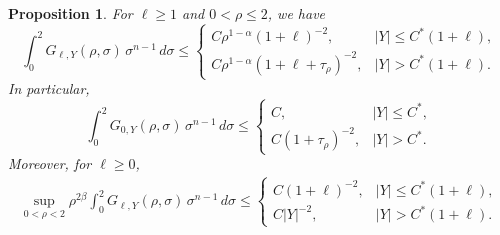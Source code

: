 \documentclass[12pt]{amsart}
\newtheorem{proposition}[theorem]{Proposition}
\begin{document}
\begin{proposition}\label{prop:Green:Shur}
For $\ell\ge 1$ and $0<\rho\le 2$, we have
\begin{equation}\label{eq_basic_R_schur_improved}
    \int_0^2 G_{\ell,Y}(\rho,\sigma) \, \sigma^{n-1} \, d\sigma \le \begin{cases}
        C \rho^{1-\alpha} (1+\ell)^{-2}, & |Y|\le C^*(1+\ell),\\[4pt]
        C \rho^{1-\alpha} (1+\ell+\tau_\rho)^{-2}, & |Y|> C^*(1+\ell).
    \end{cases}
\end{equation}
In particular,
\begin{equation}\label{eq_basic_R_schur_ell=0}
    \int_0^2 G_{0,Y}(\rho,\sigma) \, \sigma^{n-1} \, d\sigma \le \begin{cases}
        C, & |Y|\le C^*,\\[4pt]
        C (1+\tau_\rho)^{-2}, & |Y|> C^*.
    \end{cases}
\end{equation}
Moreover, for $\ell \ge 0$,
\begin{align}\label{eq_basic_R_schur}
\sup_{0<\rho<2} \rho^{2\beta} \int_0^2 G_{\ell,Y}(\rho,\sigma) \, \sigma^{n-1} \, d\sigma \le \begin{cases}
        C (1+\ell)^{-2}, & |Y|\le C^*(1+\ell),\\[4pt]
        C |Y|^{-2}, & |Y|> C^*(1+\ell).
    \end{cases}
\end{align}
\end{proposition}
\end{document}
